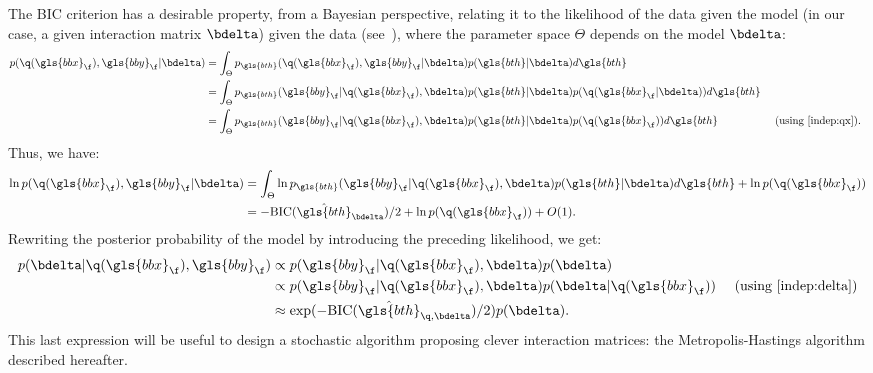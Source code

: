 The BIC criterion has a desirable property, from a Bayesian perspective, relating it to the likelihood of the data given the model (in our case, a given interaction matrix $\bdelta$) given the data (see~\cite{lebarbier}), where the parameter space $\Theta$ depends on the model $\bdelta$:
\begin{align*}
p(\q(\gls{bbx}_\f), \gls{bby}_\f | \bdelta) & = \int_{\Theta} p_{\gls{bth}}(\q(\gls{bbx}_\f), \gls{bby}_\f | \bdelta) p(\gls{bth} | \bdelta)d\gls{bth} \\
 & = \int_{\Theta} p_{\gls{bth}}(\gls{bby}_\f | \q(\gls{bbx}_\f), \bdelta) p(\gls{bth} | \bdelta) p(\q(\gls{bbx}_\f | \bdelta)) d\gls{bth} \\
 & = \int_{\Theta} p_{\gls{bth}}(\gls{bby}_\f | \q(\gls{bbx}_\f), \bdelta) p(\gls{bth} | \bdelta) p(\q(\gls{bbx}_\f)) d\gls{bth} & \text{ (using \eqref{indep:qx}). }
\end{align*}
Thus, we have:
\begin{align*}
\ln p(\q(\gls{bbx}_\f), \gls{bby}_\f | \bdelta) & = \int_{\Theta} \ln p_{\gls{bth}}(\gls{bby}_\f | \q(\gls{bbx}_\f), \bdelta) p(\gls{bth} | \bdelta) d\gls{bth} + \ln p(\q(\gls{bbx}_\f)) \\
 & = -\text{BIC}(\hat{\gls{bth}}_{\bdelta})/2 + \ln p(\q(\gls{bbx}_\f)) + O(1).
\end{align*}
Rewriting the posterior probability of the model by introducing the preceding likelihood, we get:
\begin{align*}
p(\bdelta | \q(\gls{bbx}_{\f}),\gls{bby}_{\f}) & \propto p(\gls{bby}_{\f} | \q(\gls{bbx}_{\f}), \bdelta) p(\bdelta) \\
& \propto p(\gls{bby}_{\f} | \q(\gls{bbx}_{\f}), \bdelta) p(\bdelta | \q(\gls{bbx}_{\f})) & \text{ (using \eqref{indep:delta})} \\
& \approx \exp(-\text{BIC}(\hat{\gls{bth}}_{\q,\bdelta})/2) p(\bdelta).
\end{align*}
This last expression will be useful to design a stochastic algorithm proposing clever interaction matrices: the Metropolis-Hastings algorithm described hereafter.


